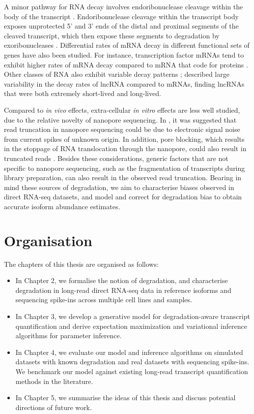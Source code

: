 A minor pathway for RNA decay involves endoribonuclease cleavage within the body of the transcript \cite{Garneau2007}. Endoribonuclease cleavage within the transcript body exposes unprotected 5’ and 3’ ends of the distal and proximal segments of the cleaved transcript, which then expose these segments to degradation by exoribonucleases \cite{ Gatfield2004,Garneau2007}. Differential rates of mRNA decay in different functional sets of genes have also been studied. For instance, transcription factor mRNAs tend to exhibit higher rates of mRNA decay compared to mRNA that code for proteins \cite{Yang2003}. Other classes of RNA also exhibit variable decay patterns \cite{Keene2010}; \cite{Kaiwan2021} described large variability in the decay rates of lncRNA compared to mRNAs, finding lncRNAs that were both extremely short-lived and long-lived. 

Compared to \textit{in vivo} effects, extra-cellular \textit{in vitro} effects are less well studied, due to the relative novelty of nanopore sequencing. In \cite{Workman2019}, it was suggested that read truncation in nanopore sequencing could be due to electronic signal noise from current spikes of unknown origin. In addition, pore blocking, which results in the stoppage of RNA translocation through the nanopore, could also result in truncated reads \cite{Amarasinghe2020}. Besides these considerations, generic factors that are not specific to nanopore sequencing, such as the fragmentation of transcripts during library preparation, can also result in the observed read truncation. Bearing in mind these sources of degradation, we aim to characterise biases observed in direct RNA-seq datasets, and model and correct for degradation bias to obtain accurate isoform abundance estimates. 

\section{Organisation}

The chapters of this thesis are organised as follows:
\begin{itemize}
    \item In Chapter 2, we formalise the notion of degradation, and characterise degradation in long-read direct RNA-seq data in reference isoforms and sequencing spike-ins across multiple cell lines and samples. 
    \item In Chapter 3, we develop a generative model for degradation-aware transcript quantification and derive expectation maximization and variational inference algorithms for parameter inference. 
    \item In Chapter 4, we evaluate our model and inference algorithms on simulated datasets with known degradation and real datasets with sequencing spike-ins. We benchmark our model against existing long-read transcript quantification methods in the literature. 
    \item In Chapter 5, we summarise the ideas of this thesis and discuss potential directions of future work. 
\end{itemize}